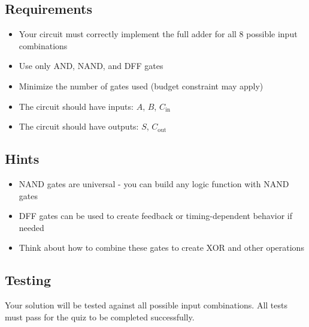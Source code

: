 \subsection*{Requirements}
\begin{itemize}
  \item Your circuit must correctly implement the full adder for all 8 possible input combinations
  \item Use only AND, NAND, and DFF gates
  \item Minimize the number of gates used (budget constraint may apply)
  \item The circuit should have inputs: $A$, $B$, $C_{\text{in}}$
  \item The circuit should have outputs: $S$, $C_{\text{out}}$
\end{itemize}

\subsection*{Hints}
\begin{itemize}
  \item NAND gates are universal - you can build any logic function with NAND gates
  \item DFF gates can be used to create feedback or timing-dependent behavior if needed
  \item Think about how to combine these gates to create XOR and other operations
\end{itemize}

\subsection*{Testing}
Your solution will be tested against all possible input combinations. All tests must pass for the quiz to be completed successfully.
